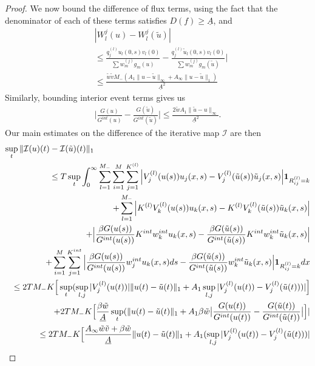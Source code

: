 \begin{proof}
We now bound
the difference of flux terms, using the fact that the denominator of each of these terms satisfies $D(f) \ge \underline A$, and
\begin{align}
&|W_l^j (u) - W_l^j(\tilde u)|\\
&\le \frac{q^{(l)}_ju_l(0,s)v_{l}(0)}{\sum w_m^{(j)} g_m(u)}- \frac{q^{(l)}_j\tilde u_l(0,s)v_{l}(0)}{\sum w_m^{(j)}g_m(\tilde u)}|\nonumber\\
&\le \frac{\tilde w \tilde vM_{-}(A_1\|u-\tilde u\|_\infty+A_\infty\|u-\tilde u\|_1)}{\underline{A}^2}\nonumber
\end{align}
Similarly, bounding interior event terms gives us
\begin{eqnarray}
\big|\frac{G(u)}{G^{int}(u)} - \frac{G(\tilde u)}{G^{int}(\tilde u)}\big| \le \frac{2\tilde w A_1 \|\tilde u-u\|_\infty}{\underline A^2}.
\end{eqnarray} 
Our main estimates on the difference of the iterative map $\mathcal I$ are then
\begin{eqnarray}\label{bigsalad}
\lefteqn{\sup_t\| \mathcal I(u)(t) - \mathcal I(\tilde u)(t)\|_1 }\\
&&\le T \sup_t\int_0^\infty \sum_{l = 1}^{M_-}\sum_{i = 1}^{M}\sum_{j= 1}^{K^{(l)}} \Big |V^{(l)}_j(u(s))u_j(x,s)-V^{(l)}_j(\tilde u(s))\tilde u_j(x,s)\Big |\mathbf{1}_{R^{(l)}_{ij}= k}\nonumber\\ 
&&+\sum_{l = 1}^{M_-}\Big |K^{(l)}V^{(l)}_k(u(s))u_k(x,s) 
-K^{(l)}V^{(l)}_k(\tilde u(s))\tilde u_k(x,s)\Big |\nonumber\\
&&+\Big |\frac{\beta G(u(s))}{G^{int}(u(s))} K^{int}w^{int}_ku_{k}(x,s)
-\frac{\beta G(\tilde u(s))}{G^{int}(\tilde u(s))} K^{int}w^{int}_k\tilde u_{k}(x,s)\Big |\nonumber\\
&&+\sum_{i = 1}^{M}\sum_{j= 1}^{K^{int}}\Big |\frac{\beta G(u(s))}{G^{int}(u(s))}  w^{int}_ju_{k}(x,s)ds-\frac{\beta G(\tilde u(s))}{G^{int}(\tilde u(s))}  w^{int}_k\tilde u_{k}(x,s)\Big |\mathbf{1}_{R^{(l)}_{ij}= k}dx\nonumber\\
&&\le 2TM_{-}K\Big[\sup_t(\sup_{l,j}|V^{(l)}_j(u(t))| \|u(t)-\tilde u(t)\|_1+A_1\sup_{l,j}| V^{(l)}_j(u(t)) -  V^{(l)}_j(\tilde u(t)))|\Big] \nonumber\\
&&+2TM_{-}K\Big[\frac{\beta\tilde w}{\underline{A}}\sup_t(\|u(t)-\tilde u(t)\|_1+A_1\beta\tilde w\big|\frac{G(u(t))}{G^{int}(u(t))} - \frac{G(\tilde u(t))}{G^{int}(\tilde u(t))}\big|\Big]|\nonumber\\
&&\le2TM_{-}K\Big[ \frac{A_\infty \tilde w \tilde v+\beta \tilde w}{\underline{A}} \|u(t)-\tilde u(t)\|_1+A_1(\sup_{l,j}|V^{(l)}_j(u(t)) -  V^{(l)}_j(\tilde u(t)))|\nonumber\\

\end{eqnarray}
\end{proof}
